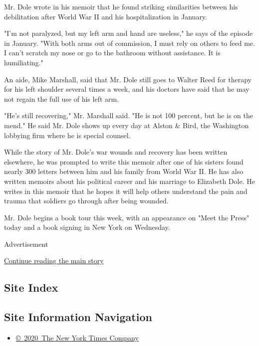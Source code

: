 Mr. Dole wrote in his memoir that he found striking similarities between
his debilitation after World War II and his hospitalization in January.

"I'm not paralyzed, but my left arm and hand are useless," he says of
the episode in January. "With both arms out of commission, I must rely
on others to feed me. I can't scratch my nose or go to the bathroom
without assistance. It is humiliating."

An aide, Mike Marshall, said that Mr. Dole still goes to Walter Reed for
therapy for his left shoulder several times a week, and his doctors have
said that he may not regain the full use of his left arm.

"He's still recovering," Mr. Marshall said. "He is not 100 percent, but
he is on the mend." He said Mr. Dole shows up every day at Alston \&
Bird, the Washington lobbying firm where he is special counsel.

While the story of Mr. Dole's war wounds and recovery has been written
elsewhere, he was prompted to write this memoir after one of his sisters
found nearly 300 letters between him and his family from World War II.
He has also written memoirs about his political career and his marriage
to Elizabeth Dole. He writes in this memoir that he hopes it will help
others understand the pain and trauma that soldiers go through after
being wounded.

Mr. Dole begins a book tour this week, with an appearance on "Meet the
Press" today and a book signing in New York on Wednesday.

Advertisement

\protect\hyperlink{after-bottom}{Continue reading the main story}

\hypertarget{site-index}{%
\subsection{Site Index}\label{site-index}}

\hypertarget{site-information-navigation}{%
\subsection{Site Information
Navigation}\label{site-information-navigation}}

\begin{itemize}
\tightlist
\item
  \href{https://help.nytimes.com/hc/en-us/articles/115014792127-Copyright-notice}{©~2020~The
  New York Times Company}
\end{itemize}

